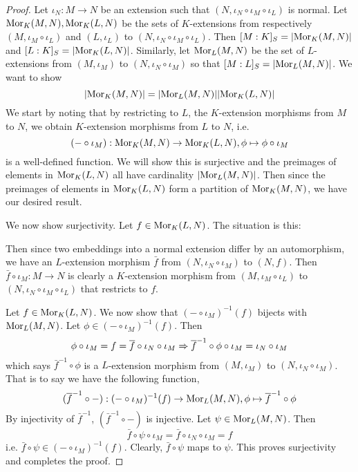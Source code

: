 \documentclass[../book.tex]{subfiles}
\begin{document}
\begin{proof}
    Let $\iota_N : M \to N$ be an extension such that 
    $(N,\iota_N\circ\iota_M\circ\iota_L)$ is normal. 
    Let $\text{Mor}_{K}(M, N), \text{Mor}_{K}(L, N)$ be the sets of $K$-extensions
    from respectively $(M,\iota_M\circ\iota_L)$ and $(L,\iota_L)$ 
    to $(N,\iota_N\circ\iota_M\circ\iota_L)$. 
    Then $[M:K]_S = |\text{Mor}_{K}(M, N)|$ and $[L:K]_S = |\text{Mor}_{K}(L, N)|$.
    Similarly, let $\text{Mor}_{L}(M, N)$ be the set of $L$-extensions
    from $(M,\iota_M)$ to $(N,\iota_N\circ\iota_M)$ so that 
    $[M:L]_S = |\text{Mor}_{L}(M, N)|$.
    We want to show \[
        |\text{Mor}_{K}(M, N)| = |\text{Mor}_{L}(M, N)| |\text{Mor}_{K}(L, N)|
    \]
    We start by noting that by restricting to $L$, 
    the $K$-extension morphisms from $M$ to $N$,
    we obtain $K$-extension morphisms from $L$ to $N$, i.e.
    \[
        (- \circ \iota_M) : \text{Mor}_{K}(M, N) \to \text{Mor}_{K}(L, N), 
        \phi \mapsto \phi\circ\iota_M
    \]
    is a well-defined function. 
    We will show this is surjective and 
    the preimages of elements in $\text{Mor}_{K}(L, N)$ 
    all have cardinality $|\text{Mor}_{L}(M, N)|$.
    Then since the preimages of elements in $\text{Mor}_{K}(L, N)$ form
    a partition of $\text{Mor}_{K}(M, N)$, we have our desired result. 
    
    We now show surjectivity. 
    Let $f \in \text{Mor}_{K}(L, N)$. 
    The situation is this: \begin{figure}[H]
        \centering
    \end{figure}
    Then since two embeddings into a normal extension differ by an automorphism,
    we have an $L$-extension morphism $\bar{f}$ 
    from $(N,\iota_N\circ\iota_M)$ to $(N,f)$. 
    Then $\bar{f}\circ\iota_M : M \to N$ is clearly
    a $K$-extension morphism from $(M,\iota_M\circ\iota_L)$ 
    to $(N,\iota_N\circ\iota_M\circ\iota_L)$ that restricts to $f$. 
    
    Let $f \in \text{Mor}_{K}(L, N)$. 
    We now show that $(- \circ \iota_M)^{-1}(f)$ bijects with $\text{Mor}_{L}(M, N)$.
    Let $\phi \in (- \circ \iota_M)^{-1}(f)$.
    Then \[
        \phi\circ\iota_M = f = \overline{f}\circ\iota_N\circ\iota_M 
        \Rightarrow \overline{f}^{-1}\circ\phi\circ\iota_M = \iota_N\circ\iota_M 
    \]
    which says $\bar{f}^{-1}\circ\phi$ is a $L$-extension morphism
    from $(M,\iota_M)$ to $(N,\iota_N\circ\iota_M)$.
    That is to say we have the following function, \[
        (\overline{f}^{-1} \circ -) : (- \circ \iota_M)^{-1}(f) \to \text{Mor}_{L}(M, N),
        \phi \mapsto \overline{f}^{-1}\circ\phi
    \]
    By injectivity of $\bar{f}^{-1}$, $(\bar{f}^{-1} \circ -)$ is injective.
    Let $\psi \in \text{Mor}_{L}(M, N)$. Then \[
        \bar{f}\circ\psi\circ\iota_M = \bar{f}\circ\iota_N\circ\iota_M = f
    \]
    i.e. $\bar{f}\circ\psi \in (- \circ \iota_M)^{-1}(f)$.
    Clearly, $\bar{f}\circ\psi$ maps to $\psi$.
    This proves surjectivity and completes the proof. 
\end{proof}
\end{document}
